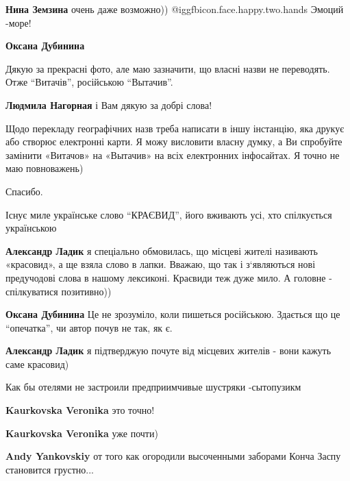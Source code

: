\begin{itemize}
\textbf{Нина Земзина} очень даже возможно)) @igg{fbicon.face.happy.two.hands}  Эмоций -море!

\textbf{Оксана Дубинина} 

Дякую за прекрасні фото, але маю зазначити, що власні назви не переводять. Отже
\enquote{Витачів}, російською \enquote{Вытачив}.

\begin{itemize} %
\textbf{Людмила Нагорная} і Вам дякую за добрі слова!

Щодо перекладу географічних назв треба написати в іншу інстанцію, яка друкує
або створює електронні карти. Я можу висловити власну думку, а Ви спробуйте
замінити «Витачов» на «Вытачив» на всіх електронних інфосайтах. Я точно не маю
повноважень)

\end{itemize} %

Спасибо.


Існує миле українське слово \enquote{КРАЄВИД}, його вживають усі, хто
спілкується українською

\begin{itemize} %
\textbf{Александр Ладик} я спеціально обмовилась, що місцеві жителі називають «красовид», а ще взяла слово в лапки.
Вважаю, що так і з‘являються нові предучодові слова в нашому лексиконі.
Краєвиди теж дуже мило.
А головне - спілкуватися позитивно))

\textbf{Оксана Дубинина} Це не зрозуміло, коли пишеться російською. Здається що це \enquote{опечатка}, чи автор почув не так, як є.

\textbf{Александр Ладик} я підтверджую почуте від місцевих жителів - вони кажуть саме красовид)
\end{itemize} %

Как бы отелями не застроили предприимчивые шустряки -сытопузикм

\begin{itemize} %
\textbf{Kaurkovska Veronika} это точно!

\textbf{Kaurkovska Veronika} уже почти)

\begin{itemize} %
\textbf{Andy Yankovskiy} от того как огородили высоченными заборами Конча Заспу становится грустно...


\end{itemize}
\end{itemize}
\end{itemize}

